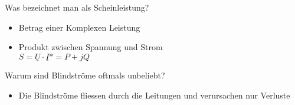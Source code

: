 \begin{karte}{Was bezeichnet man als Scheinleistung?}
	\begin{itemize}
		\item Betrag einer Komplexen Leistung
		\item Produkt zwischen Spannung und Strom\\
		$S=\underline{U}\cdot \underline{I}* = P + jQ$
	\end{itemize}
\end{karte}

\begin{karte}{Warum sind Blindströme oftmals unbeliebt?}
	\begin{itemize}
		\item Die Blindströme fliessen durch die Leitungen und verursachen nur Verluste
	\end{itemize}
	
\end{karte}
